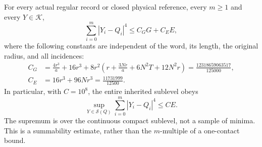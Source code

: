 \begin{theorem}
\label{thm:ss-quartic}
For every actual regular record or closed physical reference, every
$m\ge1$ and every $Y\in\mathcal K$,
\begin{equation}\label{eq:ss-global-gap}
 \sum_{i=0}^m|Y_i-Q_i|^4\le C_G G+C_E E,
\end{equation}
where the following constants are independent of the word, its length,
the original radius, and all incidences:
\begin{align}
 C_G&=\frac{4r^3}{a}+16r^3+
 8r^2\left(r+\frac{3Nr}{a}+6N^2T+12N^2r\right)
       =\frac{12318659063517}{125000},\label{eq:ss-CG}\\
 C_E&=16r^3+96Nr^3=\frac{11731999}{12500}.
 \label{eq:ss-CE}
\end{align}
In particular, with $C=10^8$, the entire inherited sublevel obeys
\begin{equation}\label{eq:ss-sublevel-sum}
 \sup_{Y\in\mathcal S(Q)}\sum_{i=0}^m|Y_i-Q_i|^4\le CE.
\end{equation}
The supremum is over the continuous compact sublevel, not a sample of
minima. This is a summability estimate, rather than the $m$-multiple of
a one-contact bound.
\end{theorem}
